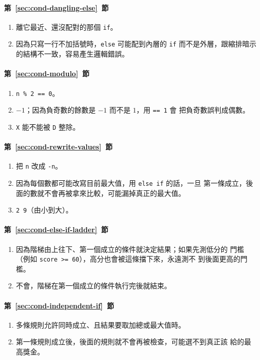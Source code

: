 \paragraph{第~\ref{sec:cond-dangling-else}~節}
\begin{enumerate}
\item 離它最近、還沒配對的那個 \texttt{if}。
\item 因為只寫一行不加括號時，\texttt{else} 可能配到內層的 \texttt{if}
而不是外層，跟縮排暗示的結構不一致，容易產生邏輯錯誤。
\end{enumerate}

\paragraph{第~\ref{sec:cond-modulo}~節}
\begin{enumerate}
\item \texttt{n \% 2 == 0}。
\item $-1$；因為負奇數的餘數是 $-1$ 而不是 $1$，用 \texttt{== 1} 會
把負奇數誤判成偶數。
\item \texttt{X} 能不能被 \texttt{D} 整除。
\end{enumerate}

\paragraph{第~\ref{sec:cond-rewrite-values}~節}
\begin{enumerate}
\item 把 \texttt{n} 改成 \texttt{-n}。
\item 因為每個數都可能改寫目前最大值，用 \texttt{else if} 的話，一旦
第一條成立，後面的數就不會再被拿來比較，可能漏掉真正的最大值。
\item \texttt{2 9}（由小到大）。
\end{enumerate}

\paragraph{第~\ref{sec:cond-else-if-ladder}~節}
\begin{enumerate}
\item 因為階梯由上往下、第一個成立的條件就決定結果；如果先測低分的
門檻（例如 \texttt{score >= 60}），高分也會被這條擋下來，永遠測不
到後面更高的門檻。
\item 不會，階梯在第一個成立的條件執行完後就結束。
\end{enumerate}

\paragraph{第~\ref{sec:cond-independent-if}~節}
\begin{enumerate}
\item 多條規則允許同時成立、且結果要取加總或最大值時。
\item 第一條規則成立後，後面的規則就不會再被檢查，可能選不到真正該
給的最高獎金。
\end{enumerate}

